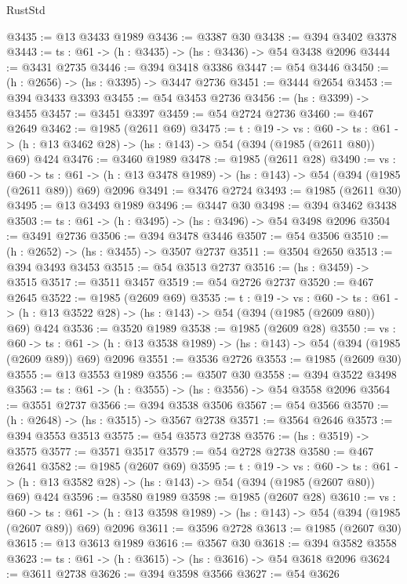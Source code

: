 \begin{lexlean}{RustStd}
\begin{coremodule}
{\begin{coremodule}
{{{{{{{{@3435 := @13 @3433 @1989
@3436 := @3387 @30
@3438 := @394 @3402 @3378
@3443 := {ts : @61} -> (h : @3435) -> (hs : @3436) -> @54 @3438 @2096
@3444 := @3431 @2735
@3446 := @394 @3418 @3386
@3447 := @54 @3446
@3450 := (h : @2656) -> (hs : @3395) -> @3447 @2736
@3451 := @3444 @2654
@3453 := @394 @3433 @3393
@3455 := @54 @3453 @2736
@3456 := (hs : @3399) -> @3455
@3457 := @3451 @3397
@3459 := @54 @2724 @2736
@3460 := @467 @2649
@3462 := @1985 (@2611 @69)
@3475 := {t : @19} ->
  {vs : @60} ->
  {ts : @61} -> (h : @13 @3462 @28) -> (hs : @143) -> @54 (@394 (@1985 (@2611 @80)) @69) @424
@3476 := @3460 @1989
@3478 := @1985 (@2611 @28)
@3490 := {vs : @60} ->
  {ts : @61} -> (h : @13 @3478 @1989) -> (hs : @143) -> @54 (@394 (@1985 (@2611 @89)) @69) @2096
@3491 := @3476 @2724
@3493 := @1985 (@2611 @30)
@3495 := @13 @3493 @1989
@3496 := @3447 @30
@3498 := @394 @3462 @3438
@3503 := {ts : @61} -> (h : @3495) -> (hs : @3496) -> @54 @3498 @2096
@3504 := @3491 @2736
@3506 := @394 @3478 @3446
@3507 := @54 @3506
@3510 := (h : @2652) -> (hs : @3455) -> @3507 @2737
@3511 := @3504 @2650
@3513 := @394 @3493 @3453
@3515 := @54 @3513 @2737
@3516 := (hs : @3459) -> @3515
@3517 := @3511 @3457
@3519 := @54 @2726 @2737
@3520 := @467 @2645
@3522 := @1985 (@2609 @69)
@3535 := {t : @19} ->
  {vs : @60} ->
  {ts : @61} -> (h : @13 @3522 @28) -> (hs : @143) -> @54 (@394 (@1985 (@2609 @80)) @69) @424
@3536 := @3520 @1989
@3538 := @1985 (@2609 @28)
@3550 := {vs : @60} ->
  {ts : @61} -> (h : @13 @3538 @1989) -> (hs : @143) -> @54 (@394 (@1985 (@2609 @89)) @69) @2096
@3551 := @3536 @2726
@3553 := @1985 (@2609 @30)
@3555 := @13 @3553 @1989
@3556 := @3507 @30
@3558 := @394 @3522 @3498
@3563 := {ts : @61} -> (h : @3555) -> (hs : @3556) -> @54 @3558 @2096
@3564 := @3551 @2737
@3566 := @394 @3538 @3506
@3567 := @54 @3566
@3570 := (h : @2648) -> (hs : @3515) -> @3567 @2738
@3571 := @3564 @2646
@3573 := @394 @3553 @3513
@3575 := @54 @3573 @2738
@3576 := (hs : @3519) -> @3575
@3577 := @3571 @3517
@3579 := @54 @2728 @2738
@3580 := @467 @2641
@3582 := @1985 (@2607 @69)
@3595 := {t : @19} ->
  {vs : @60} ->
  {ts : @61} -> (h : @13 @3582 @28) -> (hs : @143) -> @54 (@394 (@1985 (@2607 @80)) @69) @424
@3596 := @3580 @1989
@3598 := @1985 (@2607 @28)
@3610 := {vs : @60} ->
  {ts : @61} -> (h : @13 @3598 @1989) -> (hs : @143) -> @54 (@394 (@1985 (@2607 @89)) @69) @2096
@3611 := @3596 @2728
@3613 := @1985 (@2607 @30)
@3615 := @13 @3613 @1989
@3616 := @3567 @30
@3618 := @394 @3582 @3558
@3623 := {ts : @61} -> (h : @3615) -> (hs : @3616) -> @54 @3618 @2096
@3624 := @3611 @2738
@3626 := @394 @3598 @3566
@3627 := @54 @3626
}}}}}}}}
\end{coremodule}}
\end{coremodule}
\end{lexlean}
